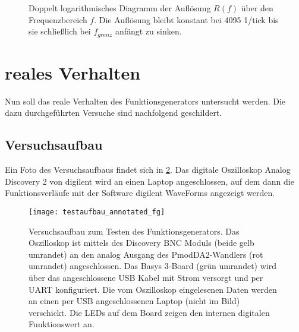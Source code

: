 \begin{figure}[h] \centering
 \caption{Doppelt logarithmisches Diagramm der Auflösung $R(f)$ über den Frequenzbereich $f$. Die Auflösung bleibt konstant bei 4095 1/tick bis sie schließlich bei $f_{grenz}$ anfängt zu sinken.} \label{test:theo:res:plot}
\end{figure}

\section{reales Verhalten}
Nun soll das reale Verhalten des Funktionsgenerators untersucht werden.
Die dazu durchgeführten Versuche sind nachfolgend geschildert.

\subsection{Versuchsaufbau}
Ein Foto des Versuchsaufbaus findet sich in \cref{test:real:setup:pic}.
Das digitale Oszilloskop Analog Discovery 2 von digilent wird an einen Laptop angeschlossen, auf dem dann die Funktionsverläufe mit der Software digilent WaveForms angezeigt werden.

\begin{figure}[h] \centering
  \texttt{[image: testaufbau\_annotated\_fg]}
  \caption{Versuchsaufbau zum Testen des Funktionsgenerators. Das Oszilloskop ist mittels des Discovery BNC Moduls (beide gelb umrandet) an den analog Ausgang des PmodDA2-Wandlers (rot umrandet) angeschlossen. Das Basys 3-Board (grün umrandet) wird über das angeschlossene USB Kabel mit Strom versorgt und per UART konfiguriert. Die vom Oszilloskop eingelesenen Daten werden an einen per USB angeschlossenen Laptop (nicht im Bild) verschickt. Die LEDs auf dem Board zeigen den internen digitalen Funktionswert an.}
  \label{test:real:setup:pic}
\end{figure}

